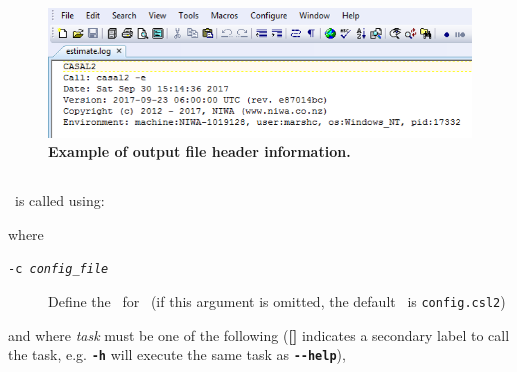 \begin{figure}[htp]
	\includegraphics[scale=1]{Figures/eglog.png}
	\caption{\textbf{Example of output file header information.}}\label{fig:log_file_1}
\end{figure}

\vspace*{4mm}

\subsection{\label{sec:command-line-arguments}}

\CNAME\ is called using:

\texttt{}

where

\begin{description}
 \item [\texttt{-c \emph{config\_file}}] Define the \config~for \CNAME\ (if this argument is omitted, the default \config\ is \texttt{config.csl2})
\end{description}

and where \emph{task} must be one of the following (\textbf{[]} indicates a secondary label to call the task, e.g. \textbf{\texttt{-h}} will execute the same task as \textbf{\texttt{-{}-help}}),

